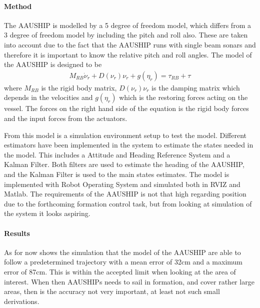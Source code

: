 \documentclass[a4paper,12pt]{article}
\begin{document}
\paragraph{Method}
The AAUSHIP is modelled by a 5 degree of freedom model, which differs from a 3 degree of freedom model by including the pitch and roll also. These are taken into account due to the fact that the AAUSHIP runs with single beam sonars and therefore it is important to know the relative pitch and roll angles. The model of the AAUSHIP is designed to be
\begin{align}
M_{RB} \dot \nu_r + D(\nu_r)\nu_r + g(\eta_r) = \tau_{RB} + \tau
\end{align}
where $M_{RB}$ is the rigid body matrix, $D(\nu_r)\nu_r$ is the damping matrix which depends in the velocities and $g(\eta_r)$ which is the restoring forces acting on the vessel. The forces on the right hand side of the equation is the rigid body forces and the input forces from the actuators.

From this model is a simulation environment setup to test the model. Different estimators have been implemented in the system to estimate the states needed in the model. This includes a Attitude and Heading Reference System and a Kalman Filter. Both filters are used to estimate the heading of the AAUSHIP, and the Kalman Filter is used to the main states estimates. The model is implemented with Robot Operating System and simulated both in RVIZ and Matlab. The requirements of the AAUSHIP is not that high regarding position due to the forthcoming formation control task, but from looking at simulation of the system it looks aspiring.

\paragraph{Results}
As for now shows the simulation that the model of the AAUSHIP are able to follow a predetermined trajectory with a mean error of 32cm and a maximum error of 87cm. This is within the accepted limit when looking at the area of interest. When then AAUSHIPs needs to sail in formation, and cover rather large areas, then is the accuracy not very important, at least not such small derivations.
\end{document}
